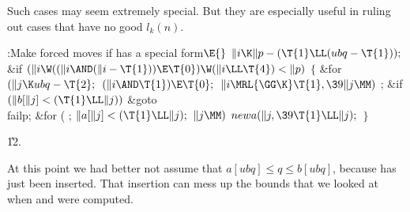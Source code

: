 Such cases may seem extremely special. But they are especially
useful in ruling out cases that have no good $l_k(n)$.

\Y\B\4:Make forced moves if  has a special form\X${}\E{}$\6
$\|i\K\|p-(\T{1}\LL(\\{ubq}-\T{1}));{}$\6
\&{if} ${}(\|i\W((\|i\AND(\|i-\T{1}))\E\T{0})\W(\|i\LL\T{4})<\|p){}$\5
${}\{{}$\1\6
\&{for} ${}(\|j\K\\{ubq}-\T{2};{}$ ${}(\|i\AND\T{1})\E\T{0};{}$ ${}\|i\MRL{{%
\GG}{\K}}\T{1},\39\|j\MM){}$\1\5
;\2\6
\&{if} ${}(\|b[\|j]<(\T{1}\LL\|j)){}$\1\5
\&{goto} \\{failp};\2\6
\&{for} ( ; ${}\|a[\|j]<(\T{1}\LL\|j);{}$ ${}\|j\MM){}$\1\5
${}\\{newa}(\|j,\39\T{1}\LL\|j);{}$\2\6
\4${}\}{}$\2\par
\U12.\fi

At this point we had better not assume that $a[ubq]\le q%
\le b[ubq]$,
because  has just been inserted. That insertion can mess up the
bounds that we looked at when  and  were computed.

